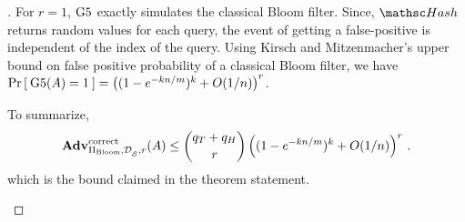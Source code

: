 \begin{proof}[]
For $r=1$, $\text{G5}$ exactly simulates the classical Bloom filter. Since, $\Hash$ returns random values for each query, the event of getting a false-positive is independent of the index of the query. Using Kirsch and Mitzenmacher's upper bound on false positive probability of a classical Bloom filter, we have  $\Pr\left[\: \text{G5}(A)=1 \:\right] = \left( (1-e^{-kn/m})^k + O(1/n) \right)^r$.

To summarize, 
\[
\mathrm{\mathbf{Adv}}^{\mathrm{correct}}_{\Pi_{\mathrm{Bloom}},\mathcal{D}_{{\cal S}}^{},r}(A) \leq  {\dbinom{q_T + q_H}{r}} \left( (1-e^{-kn/m})^k + O(1/n) \right)^r\,.
\]
which is the bound claimed in the theorem statement.
\begin{figure}
\end{figure}
\end{proof}
